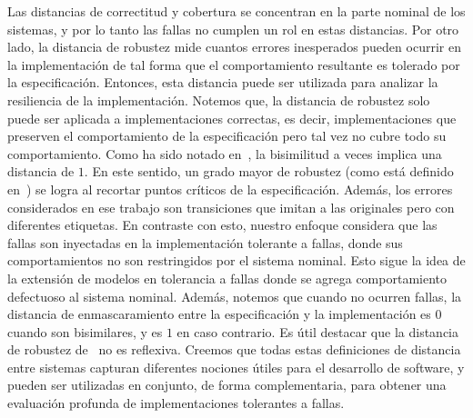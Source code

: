 Las distancias de correctitud y cobertura se concentran en la parte nominal de los sistemas, y por lo tanto las fallas no cumplen un rol en estas distancias. Por otro lado, la distancia de robustez mide cuantos errores inesperados pueden ocurrir en la implementación de tal forma que el comportamiento resultante es tolerado por la especificación. Entonces, esta distancia puede ser utilizada para analizar la resiliencia de la implementación. Notemos que, la distancia de robustez solo puede ser aplicada a implementaciones correctas, es decir, implementaciones que preserven el comportamiento de la especificación pero tal vez no cubre todo su comportamiento. 
 Como ha sido notado en~\cite{CernyHR12}, la bisimilitud a veces implica una distancia de $1$. En este sentido, un grado mayor de robustez (como está definido en~\cite{CernyHR12}) se logra al recortar puntos críticos de la especificación. Además, los errores considerados en ese trabajo son transiciones que imitan a las originales pero con diferentes etiquetas. En contraste con esto, nuestro enfoque considera que las fallas son inyectadas en la implementación tolerante a fallas, donde sus comportamientos no son restringidos por el sistema nominal. Esto sigue la idea de la extensión de modelos en tolerancia a fallas donde se agrega comportamiento defectuoso al sistema nominal. Además, notemos que cuando no ocurren fallas, la distancia de enmascaramiento entre la especificación y la implementación es $0$ cuando son bisimilares, y es  $1$ en caso contrario.
Es útil destacar que la distancia de robustez de~\cite{CernyHR12} no es reflexiva. Creemos que todas estas definiciones de distancia entre sistemas capturan diferentes nociones útiles para el desarrollo de software, y pueden ser utilizadas en conjunto, de forma complementaria, para obtener una evaluación profunda de implementaciones tolerantes a fallas.